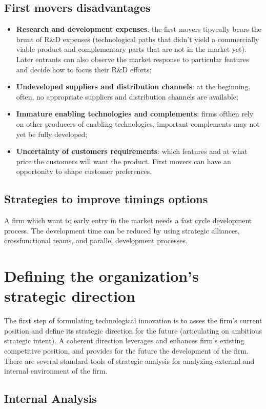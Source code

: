 \documentclass[12pt]{article}
\begin{document}
\subsection{First movers disadvantages}
\begin{itemize}
    \item \textbf{Research and development expenses}: the first movers tipycally bears the brunt of R\&D expenses (technological paths that didn't yield a commercially viable product and complementary
    parts that are not in the market yet).
    Later entrants can also observe the market response to particular features and decide how to focus their R\&D efforts;
    \item \textbf{Undeveloped suppliers and distribution channels}: at the beginning, often, no appropriate suppliers and distribution channels are available;
    \item \textbf{Immature enabling technologies and complements}: firms ofthen rely on other producers of enabling technologies, important complements may not yet be fully developed;
    \item \textbf{Uncertainty of customers requirements}: which features and at what price the customers will want the product.
    First movers can have an opportonity to shape customer preferences.
\end{itemize}
\subsection{Strategies to improve timings options}
A firm which want to early entry in the market needs a fast cycle development process.
The development time can be reduced by using strategic alliances, crossfunctional teams, and parallel development processes.
\section{Defining the organization's strategic direction}
The first step of formulating technological innovation is to asses the firm's current position and define its strategic direction for the future (articulating on ambitious strategic intent).
A coherent direction leverages and enhances firm's existing competitive position, and provides for the future the development of the firm.
There are several standard tools of strategic analysis for analyzing external and internal environment of the firm.
\subsection{Internal Analysis}
\end{document}
